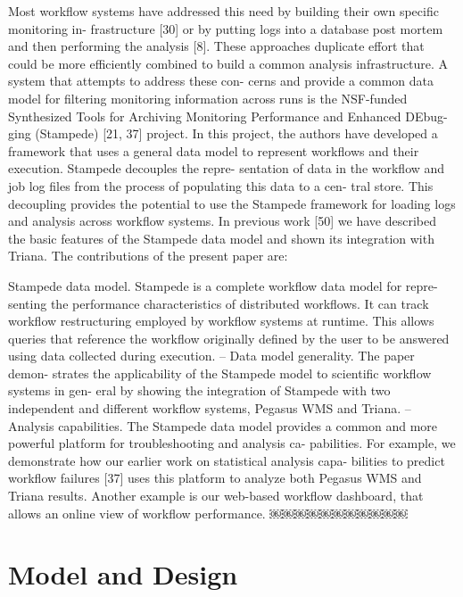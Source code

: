 \documentclass[final,5p,times,twocolumn]{elsarticle}
\begin{document}
Most workflow systems have addressed this need by building their own specific monitoring in- frastructure [30] or by putting logs into a database
post mortem and then performing the analysis [8]. These approaches duplicate effort that could be more efficiently combined to build a common analysis infrastructure.
A system that attempts to address these con- cerns and provide a common data model for filtering monitoring information across runs is the NSF-funded Synthesized Tools for Archiving Monitoring Performance and Enhanced DEbug- ging (Stampede) [21, 37] project. In this project, the authors have developed a framework that uses a general data model to represent workflows and their execution. Stampede decouples the repre- sentation of data in the workflow and job log files from the process of populating this data to a cen- tral store. This decoupling provides the potential to use the Stampede framework for loading logs and analysis across workflow systems.
In previous work [50] we have described the basic features of the Stampede data model and shown its integration with Triana. The contributions of the present paper are:

Stampede data model. Stampede is a complete workflow data model for repre- senting the performance characteristics of distributed workflows. It can track workflow restructuring employed by workflow systems at runtime. This allows queries that reference the workflow originally defined by the user to be answered using data collected during execution.
– Data model generality. The paper demon- strates the applicability of the Stampede model to scientific workflow systems in gen- eral by showing the integration of Stampede with two independent and different workflow systems, Pegasus WMS and Triana.
– Analysis capabilities. The Stampede data model provides a common and more powerful platform for troubleshooting and analysis ca- pabilities. For example, we demonstrate how our earlier work on statistical analysis capa- bilities to predict workflow failures [37] uses this platform to analyze both Pegasus WMS and Triana results. Another example is our web-based workflow dashboard, that allows an online view of workflow performance.
￼￼￼￼￼￼￼￼￼￼￼


\section{Model and Design}
\label{sec:model}
\end{document}
